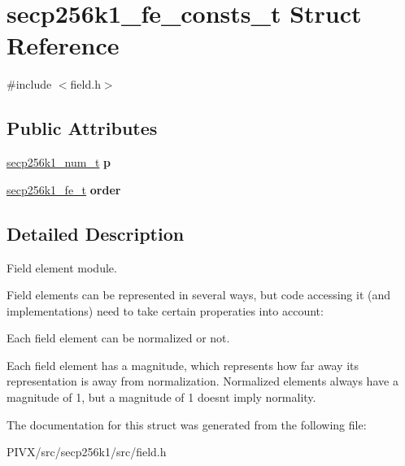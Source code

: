 \hypertarget{structsecp256k1__fe__consts__t}{}\section{secp256k1\+\_\+fe\+\_\+consts\+\_\+t Struct Reference}
\label{structsecp256k1__fe__consts__t}


{\ttfamily \#include $<$field.\+h$>$}

\subsection*{Public Attributes}
\begin{DoxyCompactItemize}
\item 
\mbox{\label{structsecp256k1__fe__consts__t_ae656567993b69f0bb28f674419ff5af6}} 
\mbox{\hyperlink{structsecp256k1__num__t}{secp256k1\+\_\+num\+\_\+t}} {\bfseries p}
\item 
\mbox{\label{structsecp256k1__fe__consts__t_a9c673aff0a37334f7fec58961e7d0696}} 
\mbox{\hyperlink{structsecp256k1__fe__t}{secp256k1\+\_\+fe\+\_\+t}} {\bfseries order}
\end{DoxyCompactItemize}


\subsection{Detailed Description}
Field element module.

Field elements can be represented in several ways, but code accessing it (and implementations) need to take certain properaties into account\+:
\begin{DoxyItemize}
\item Each field element can be normalized or not.
\item Each field element has a magnitude, which represents how far away its representation is away from normalization. Normalized elements always have a magnitude of 1, but a magnitude of 1 doesn\textquotesingle{}t imply normality. 
\end{DoxyItemize}

The documentation for this struct was generated from the following file\+:\begin{DoxyCompactItemize}
\item 
P\+I\+V\+X/src/secp256k1/src/field.\+h\end{DoxyCompactItemize}
